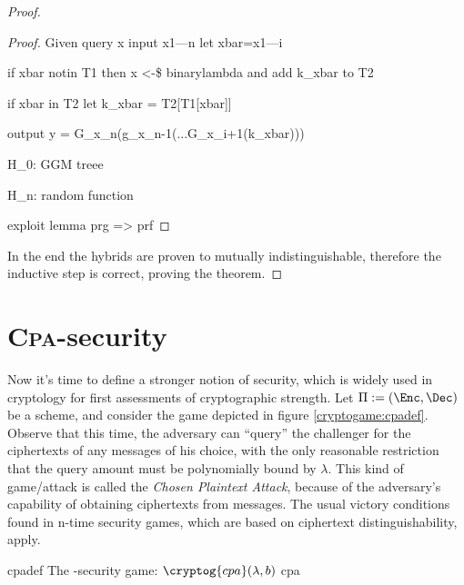 \begin{proof}
\begin{proof}
{        Given query x input x1---n let xbar=x1---i

        if xbar notin T1 then x <-\$ binarylambda and add k\_xbar to T2

        if xbar in T2 let k\_xbar = T2[T1[xbar]]

        output y = G\_x\_n(g\_x\_n-1(...G\_x\_i+1(k\_xbar)))

        H\_0: GGM treee
        
        H\_n: random function

        exploit lemma prg => prf
        }
        
    \end{proof}

    In the end the hybrids are proven to mutually indistinguishable, therefore the inductive step is correct, proving the theorem.

\end{proof}

\section{\textsc{Cpa}-security}

Now it's time to define a stronger notion of security, which is widely used in cryptology for first assessments of cryptographic strength. Let $\Pi := (\Enc, \Dec)$ be a \ske{} scheme, and consider the game depicted in figure \ref{cryptogame:cpadef}. Observe that this time, the adversary can ``query'' the challenger for the ciphertexts of any messages of his choice, with the only reasonable restriction that the query amount must be polynomially bound by $\lambda$. This kind of game/attack is called the \emph{Chosen Plaintext Attack}, because of the adversary's capability of obtaining ciphertexts from messages. The usual victory conditions found in n-time security games, which are based on ciphertext distinguishability, apply.

\begin{cryptogame}
    {cpadef}
    {The \cpa-security game: $\cryptog{cpa}(\lambda, b)$}
    {cpa}


    \cseqbeginloop
    \cseqendloop

    \cseqdelay


    \cseqdelay

    \cseqbeginloop
    \cseqendloop

    \cseqdelay


\end{cryptogame}

